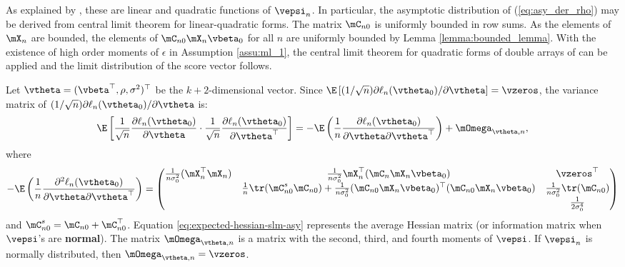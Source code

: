 \documentclass[english,12pt]{book}\usepackage[]{graphicx}\usepackage[]{xcolor}
\begin{document}
As explained by \citet[][pag. 1905]{lee2004asymptotic}, these are linear and quadratic functions of $\vepsi_n$. In particular, the asymptotic distribution of (\ref{eq:asy_der_rho}) may be derived from central limit theorem for linear-quadratic forms. The matrix $\mC_{n0}$ is uniformly bounded in row sums. As the elements of $\mX_n$ are bounded, the elements of $\mC_{n0}\mX_n\vbeta_0$ for all $n$ are uniformly bounded by Lemma \ref{lemma:bounded_lemma}. With the existence of high order moments of $\epsilon$ in Assumption \ref{assu:ml_1}, the central limit theorem for quadratic forms of double arrays of \cite{kelejian2001asymptotic} can be applied and the limit distribution of the score vector follows.

Let $\vtheta = (\vbeta^\top, \rho, \sigma^2)^\top$ be the $k+2$-dimensional vector. Since $\E\left[(1 / \sqrt{n}) \partial \ell_n (\vtheta_0)/\partial \vtheta\right]  = \vzeros$,  the variance matrix of $(1 / \sqrt{n}) \partial \ell_n(\vtheta_0) /\partial \vtheta$ is:
\begin{equation}
  \E\left[\frac{1}{\sqrt{n}}\frac{\partial \ell_n (\vtheta_0)}{\partial \vtheta}\cdot\frac{1}{\sqrt{n}}\frac{\partial \ell_n (\vtheta_0)}{\partial \vtheta^\top} \right] = - \E\left(\frac{1}{n} \frac{\partial \ell_n(\vtheta_0)}{\partial \vtheta \partial \vtheta^\top}\right) + \mOmega_{\vtheta, n},
\end{equation}
%
where 
\begin{equation}\label{eq:expected-hessian-slm-asy}
- \E\left(\frac{1}{n} \frac{\partial^2 \ell_n(\vtheta_0)}{\partial \vtheta \partial \vtheta^\top}\right)= 
	\begin{pmatrix}
	\frac{1}{n\sigma^2_0}(\mX_n^\top \mX_n)  & \frac{1}{n\sigma^2_0} \mX_n^\top (\mC_n\mX_n\vbeta_0) & \vzeros^\top \\
	   & \frac{1}{n}\tr(\mC^s_{n0}\mC_{n0}) + \frac{1}{n\sigma^2_0}(\mC_{n0}\mX_n\vbeta_0)^\top(\mC_{n0}\mX_n\vbeta_0) &  \frac{1}{n\sigma^2_0} \tr(\mC_{n0}) \\
		 &  & \frac{1}{2\sigma^4_0}
	\end{pmatrix} 
\end{equation}
%
and $\mC^s_{n0} = \mC_{n0} + \mC_{n0}^\top$. Equation \eqref{eq:expected-hessian-slm-asy} represents the average Hessian matrix (or information matrix when $\vepsi$'s are \textbf{normal}). The matrix $ \mOmega_{\vtheta, n}$ is a matrix with the second, third, and fourth moments of $\vepsi$. If $\vepsi_n$ is normally distributed, then $\mOmega_{\vtheta, n} = \vzeros$. 
\end{document}

